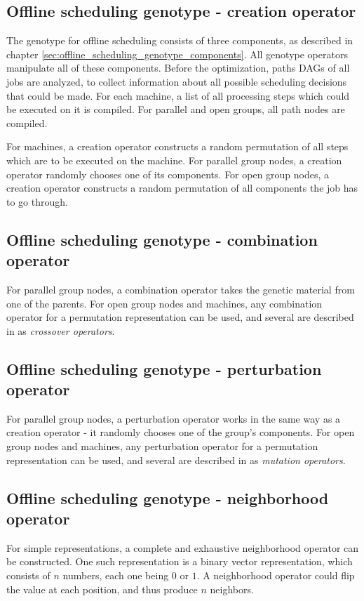 \subsection{Offline scheduling genotype - creation operator}
The genotype for offline scheduling consists of three components, as described in chapter \ref{sec:offline_scheduling_genotype_components}. All genotype operators manipulate all of these components. Before the optimization, paths DAGs of all jobs are analyzed, to collect information about all possible scheduling decisions that could be made. For each machine, a list of all processing steps which could be executed on it is compiled. For parallel and open groups, all path nodes are compiled.

For machines, a creation operator constructs a random permutation of all steps which are to be executed on the machine. For parallel group nodes, a creation operator randomly chooses one of its components. For open group nodes, a creation operator constructs a random permutation of all components the job has to go through.

\subsection{Offline scheduling genotype - combination operator}
For parallel group nodes, a combination operator takes the genetic material from one of the parents. For open group nodes and machines, any combination operator for a permutation representation can be used, and several are described in \citep{cicirello2023ecta} as \textit{crossover operators}.

\subsection{Offline scheduling genotype - perturbation operator}
For parallel group nodes, a perturbation operator works in the same way as a creation operator - it randomly chooses one of the group's components. For open group nodes and machines, any perturbation operator for a permutation representation can be used, and several are described in \citep{cicirello2023ecta} as \textit{mutation operators}.

\subsection{Offline scheduling genotype - neighborhood operator}
For simple representations, a complete and exhaustive neighborhood operator can be constructed. One such representation is a binary vector representation, which consists of $n$ numbers, each one being $0$ or $1$. A neighborhood operator could flip the value at each position, and thus produce $n$ neighbors.

